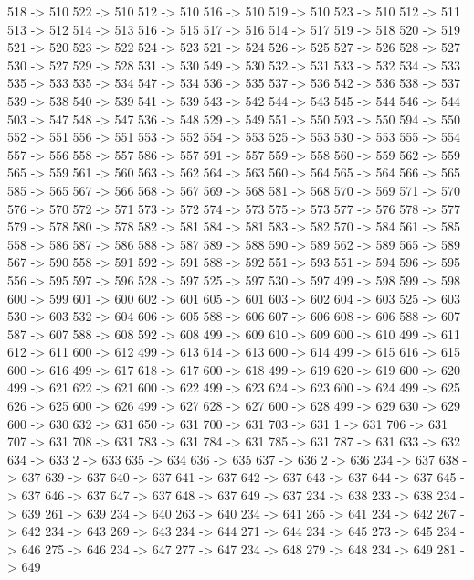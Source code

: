 {	518 -> 510
	522 -> 510
	512 -> 510
	516 -> 510
	519 -> 510
	523 -> 510
	512 -> 511
	513 -> 512
	514 -> 513
	516 -> 515
	517 -> 516
	514 -> 517
	519 -> 518
	520 -> 519
	521 -> 520
	523 -> 522
	524 -> 523
	521 -> 524
	526 -> 525
	527 -> 526
	528 -> 527
	530 -> 527
	529 -> 528
	531 -> 530
	549 -> 530
	532 -> 531
	533 -> 532
	534 -> 533
	535 -> 533
	535 -> 534
	547 -> 534
	536 -> 535
	537 -> 536
	542 -> 536
	538 -> 537
	539 -> 538
	540 -> 539
	541 -> 539
	543 -> 542
	544 -> 543
	545 -> 544
	546 -> 544
	503 -> 547
	548 -> 547
	536 -> 548
	529 -> 549
	551 -> 550
	593 -> 550
	594 -> 550
	552 -> 551
	556 -> 551
	553 -> 552
	554 -> 553
	525 -> 553
	530 -> 553
	555 -> 554
	557 -> 556
	558 -> 557
	586 -> 557
	591 -> 557
	559 -> 558
	560 -> 559
	562 -> 559
	565 -> 559
	561 -> 560
	563 -> 562
	564 -> 563
	560 -> 564
	565 -> 564
	566 -> 565
	585 -> 565
	567 -> 566
	568 -> 567
	569 -> 568
	581 -> 568
	570 -> 569
	571 -> 570
	576 -> 570
	572 -> 571
	573 -> 572
	574 -> 573
	575 -> 573
	577 -> 576
	578 -> 577
	579 -> 578
	580 -> 578
	582 -> 581
	584 -> 581
	583 -> 582
	570 -> 584
	561 -> 585
	558 -> 586
	587 -> 586
	588 -> 587
	589 -> 588
	590 -> 589
	562 -> 589
	565 -> 589
	567 -> 590
	558 -> 591
	592 -> 591
	588 -> 592
	551 -> 593
	551 -> 594
	596 -> 595
	556 -> 595
	597 -> 596
	528 -> 597
	525 -> 597
	530 -> 597
	499 -> 598
	599 -> 598
	600 -> 599
	601 -> 600
	602 -> 601
	605 -> 601
	603 -> 602
	604 -> 603
	525 -> 603
	530 -> 603
	532 -> 604
	606 -> 605
	588 -> 606
	607 -> 606
	608 -> 606
	588 -> 607
	587 -> 607
	588 -> 608
	592 -> 608
	499 -> 609
	610 -> 609
	600 -> 610
	499 -> 611
	612 -> 611
	600 -> 612
	499 -> 613
	614 -> 613
	600 -> 614
	499 -> 615
	616 -> 615
	600 -> 616
	499 -> 617
	618 -> 617
	600 -> 618
	499 -> 619
	620 -> 619
	600 -> 620
	499 -> 621
	622 -> 621
	600 -> 622
	499 -> 623
	624 -> 623
	600 -> 624
	499 -> 625
	626 -> 625
	600 -> 626
	499 -> 627
	628 -> 627
	600 -> 628
	499 -> 629
	630 -> 629
	600 -> 630
	632 -> 631
	650 -> 631
	700 -> 631
	703 -> 631
	1 -> 631
	706 -> 631
	707 -> 631
	708 -> 631
	783 -> 631
	784 -> 631
	785 -> 631
	787 -> 631
	633 -> 632
	634 -> 633
	2 -> 633
	635 -> 634
	636 -> 635
	637 -> 636
	2 -> 636
	234 -> 637
	638 -> 637
	639 -> 637
	640 -> 637
	641 -> 637
	642 -> 637
	643 -> 637
	644 -> 637
	645 -> 637
	646 -> 637
	647 -> 637
	648 -> 637
	649 -> 637
	234 -> 638
	233 -> 638
	234 -> 639
	261 -> 639
	234 -> 640
	263 -> 640
	234 -> 641
	265 -> 641
	234 -> 642
	267 -> 642
	234 -> 643
	269 -> 643
	234 -> 644
	271 -> 644
	234 -> 645
	273 -> 645
	234 -> 646
	275 -> 646
	234 -> 647
	277 -> 647
	234 -> 648
	279 -> 648
	234 -> 649
	281 -> 649
}
